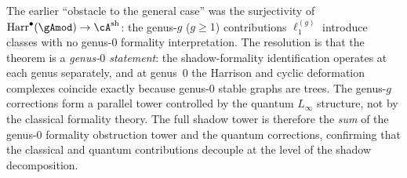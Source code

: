 \begin{remark}
\label{rem:genus-obstruction-resolved}
The earlier ``obstacle to the general case'' was the
surjectivity of
$\operatorname{Harr}^\bullet(\gAmod) \to
\cA^{\mathrm{sh}}$: the genus-$g$ ($g \geq 1$)
contributions $\ell_1^{(g)}$ introduce classes with
no genus-$0$ formality interpretation.  The resolution
is that the theorem is a \emph{genus-$0$ statement}:
the shadow-formality identification operates at each
genus separately, and at genus~$0$ the Harrison and
cyclic deformation complexes coincide exactly because
genus-$0$ stable graphs are trees.  The genus-$g$
corrections form a parallel tower controlled by the
quantum $L_\infty$ structure, not by the classical
formality theory.  The full shadow tower is therefore
the \emph{sum} of the genus-$0$ formality obstruction
tower and the quantum corrections, confirming that the
classical and quantum contributions decouple at the
level of the shadow decomposition.
\end{remark}

